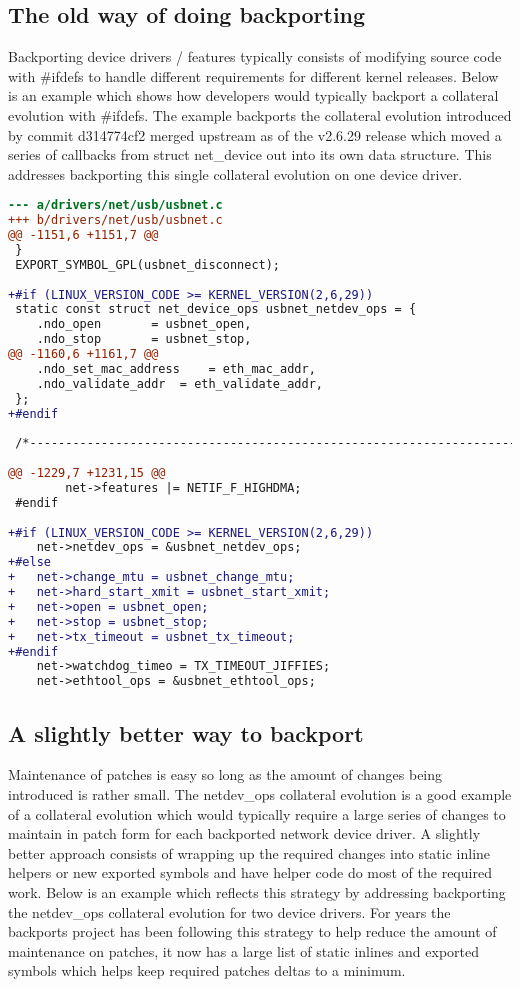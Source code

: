 \documentclass[a4paper,10pt]{article}
\begin{document}
\subsection{The old way of doing backporting}

Backporting device drivers / features typically consists of modifying source
code with \#ifdefs to handle different requirements for different kernel
releases. Below is an example which shows how developers would typically
backport a collateral evolution with \#ifdefs. The example backports the
collateral evolution introduced by commit d314774cf2 merged upstream as of the
v2.6.29 release which moved a series of callbacks from struct net\_device out
into its own data structure.  This addresses backporting this single collateral
evolution on one device driver.

\begin{lstlisting}[language=diff]
--- a/drivers/net/usb/usbnet.c
+++ b/drivers/net/usb/usbnet.c
@@ -1151,6 +1151,7 @@
 }
 EXPORT_SYMBOL_GPL(usbnet_disconnect);
 
+#if (LINUX_VERSION_CODE >= KERNEL_VERSION(2,6,29))
 static const struct net_device_ops usbnet_netdev_ops = {
 	.ndo_open		= usbnet_open,
 	.ndo_stop		= usbnet_stop,
@@ -1160,6 +1161,7 @@
 	.ndo_set_mac_address 	= eth_mac_addr,
 	.ndo_validate_addr	= eth_validate_addr,
 };
+#endif
 
 /*-------------------------------------------------------------------------*/
 
@@ -1229,7 +1231,15 @@
 		net->features |= NETIF_F_HIGHDMA;
 #endif
 
+#if (LINUX_VERSION_CODE >= KERNEL_VERSION(2,6,29))
 	net->netdev_ops = &usbnet_netdev_ops;
+#else
+	net->change_mtu = usbnet_change_mtu;
+	net->hard_start_xmit = usbnet_start_xmit;
+	net->open = usbnet_open;
+	net->stop = usbnet_stop;
+	net->tx_timeout = usbnet_tx_timeout;
+#endif
 	net->watchdog_timeo = TX_TIMEOUT_JIFFIES;
 	net->ethtool_ops = &usbnet_ethtool_ops;
\end{lstlisting}

\subsection{A slightly better way to backport}

Maintenance of patches is easy so long as the amount of changes being
introduced is rather small. The netdev\_ops collateral evolution is a good
example of a collateral evolution which would typically require a large series
of changes to maintain in patch form for each backported network device driver.
A slightly better approach consists of wrapping up the required changes into
static inline helpers or new exported symbols and have helper code do most of
the required work. Below is an example which reflects this strategy by
addressing backporting the netdev\_ops collateral evolution for two device
drivers. For years the backports project has been following this strategy to
help reduce the amount of maintenance on patches, it now has a large list of
static inlines and exported symbols which helps keep required patches deltas to
a minimum.
\end{document}
